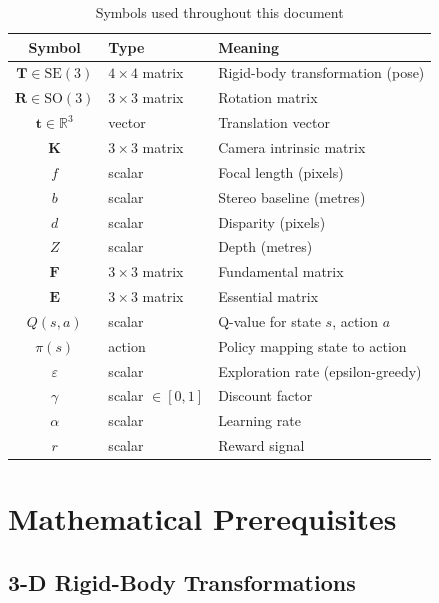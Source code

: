 \documentclass[12pt,a4paper,twoside]{report}
\theoremstyle{definition}
\newcommand{\vect}[1]{\bm{#1}}
\newcommand{\mat}[1]{\mathbf{#1}}
\newcommand{\R}{\mathbb{R}}
\newcommand{\SE}{\mathrm{SE}(3)}
\newcommand{\SO}{\mathrm{SO}(3)}
\begin{document}
\begin{table}[H]
\centering
\caption{Symbols used throughout this document}\label{tab:notation}
\begin{tabular}{clp{7cm}}
\toprule
\textbf{Symbol} & \textbf{Type} & \textbf{Meaning} \\ \midrule
$\mat{T} \in \SE$ & $4\times4$ matrix & Rigid-body transformation (pose) \\
$\mat{R} \in \SO$ & $3\times3$ matrix & Rotation matrix \\
$\vect{t} \in \R^3$ & vector & Translation vector \\
$\mat{K}$           & $3\times3$ matrix & Camera intrinsic matrix \\
$f$                 & scalar & Focal length (pixels) \\
$b$                 & scalar & Stereo baseline (metres) \\
$d$                 & scalar & Disparity (pixels) \\
$Z$                 & scalar & Depth (metres) \\
$\mat{F}$           & $3\times3$ matrix & Fundamental matrix \\
$\mat{E}$           & $3\times3$ matrix & Essential matrix \\
$Q(s,a)$            & scalar & Q-value for state $s$, action $a$ \\
$\pi(s)$            & action & Policy mapping state to action \\
$\varepsilon$       & scalar & Exploration rate (epsilon-greedy) \\
$\gamma$            & scalar $\in[0,1]$ & Discount factor \\
$\alpha$            & scalar & Learning rate \\
$r$                 & scalar & Reward signal \\
\bottomrule
\end{tabular}
\end{table}

\chapter{Mathematical Prerequisites}

\section{3-D Rigid-Body Transformations}
\end{document}
